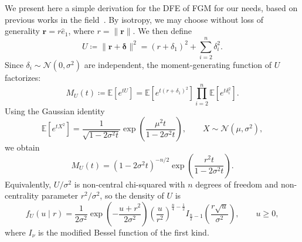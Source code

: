 We present here a simple derivation for the DFE of FGM for our needs,
based on previous works in the field~\cite{fisher_isotropic, martin_general_2006}.
By isotropy, we may choose without loss of generality \(\mathbf r = r \hat e_1\), where \(r=\|\mathbf r\|\).
We then define
\begin{equation}
    U \coloneq \|\mathbf r+\boldsymbol\delta\|^2
    =
    (r+\delta_1)^2+\sum_{i=2}^n \delta_i^2.
    \label{eq:U-def}
\end{equation}
Since \(\delta_i\sim \mathcal N(0,\sigma^2)\) are independent, the moment-generating function of \(U\) factorizes:
\begin{equation}
    M_U(t)
    \coloneq
    \mathbb E[e^{tU}]
    =
    \mathbb E[e^{t(r+\delta_1)^2}]
    \prod_{i=2}^n \mathbb E[e^{t\delta_i^2}].
\end{equation}
Using the Gaussian identity
\begin{equation}
    \mathbb E[e^{tX^2}]
    =
    \frac{1}{\sqrt{1-2\sigma^2 t}}
    \exp\!\left(\frac{\mu^2 t}{1-2\sigma^2 t}\right),
    \qquad
    X\sim\mathcal N(\mu,\sigma^2),
\end{equation}
we obtain
\begin{equation}
    M_U(t)
    =
    (1-2\sigma^2 t)^{-n/2}
    \exp\!\left(\frac{r^2 t}{1-2\sigma^2 t}\right).
    \label{eq:U-mgf}
\end{equation}
Equivalently, \(U/\sigma^2\) is non-central chi-squared with \(n\) degrees of freedom and non-centrality parameter \(r^2/\sigma^2\), so the density of \(U\) is
\begin{equation}
    f_U(u\mid r)
    =
    \frac{1}{2\sigma^2}
    \exp\!\left(-\frac{u+r^2}{2\sigma^2}\right)
    \left(\frac{u}{r^2}\right)^{\frac{n}{4}-\frac12}
    I_{\frac n2-1}\!\left(\frac{r\sqrt u}{\sigma^2}\right),
    \qquad u\ge 0,
    \label{eq:U-density}
\end{equation}
where \(I_\nu\) is the modified Bessel function of the first kind.


